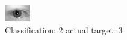 \begin{figure}[h!]
\begin{center}
\includegraphics[width=0.60\columnwidth]{figures/ID681_class_2_target_3.png}
\end{center}
\caption{ Classification: 2 actual target: 3}
\label{fig:ID681_class_2_target_3}
\end{figure}
